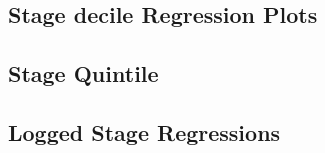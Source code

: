 \documentclass[
]{article}
\begin{document}
\hypertarget{stage-decile-regression-plots}{%
\subsection{Stage decile Regression
Plots}\label{stage-decile-regression-plots}}

\hypertarget{stage-quintile}{%
\subsection{Stage Quintile}\label{stage-quintile}}

\hypertarget{logged-stage-regressions}{%
\subsection{Logged Stage Regressions}\label{logged-stage-regressions}}
\end{document}
